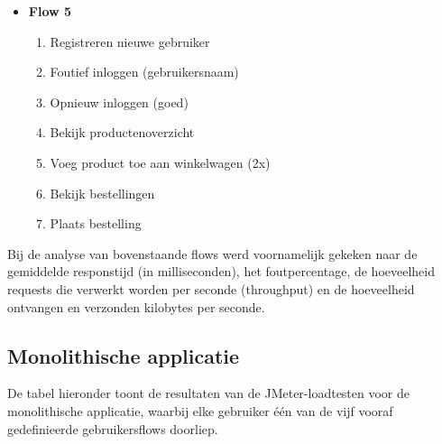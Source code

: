 \begin{itemize}
	\item \textbf{Flow 5}
	\begin{enumerate}
		\item Registreren nieuwe gebruiker
		\item Foutief inloggen (gebruikersnaam)
		\item Opnieuw inloggen (goed)
		\item Bekijk productenoverzicht
		\item Voeg product toe aan winkelwagen (2x)
		\item Bekijk bestellingen
		\item Plaats bestelling
	\end{enumerate}
\end{itemize}

Bij de analyse van bovenstaande flows werd voornamelijk gekeken naar de gemiddelde responstijd (in milliseconden), het foutpercentage, de hoeveelheid requests die verwerkt worden per seconde (throughput) en de hoeveelheid ontvangen en verzonden kilobytes per seconde.

\subsection{Monolithische applicatie}

De tabel hieronder toont de resultaten van de JMeter-loadtesten voor de monolithische applicatie, waarbij elke gebruiker één van de vijf vooraf gedefinieerde gebruikersflows doorliep.

\begin{table}[H]
	\centering
	\caption{Overzicht van JMeter-resultaten voor de monolithische applicatie.}
\end{table}

